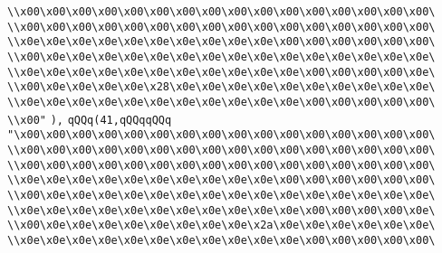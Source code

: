 \verb|\\x00\x00\x00\x00\x00\x00\x00\x00\x00\x00\x00\x00\x00\x00\x00\x00\|\newline
\verb|\\x00\x00\x00\x00\x00\x00\x00\x00\x00\x00\x00\x00\x00\x00\x00\x00\|\newline
\verb|\\x0e\x0e\x0e\x0e\x0e\x0e\x0e\x0e\x0e\x0e\x00\x00\x00\x00\x00\x00\|\newline
\verb|\\x00\x0e\x0e\x0e\x0e\x0e\x0e\x0e\x0e\x0e\x0e\x0e\x0e\x0e\x0e\x0e\|\newline
\verb|\\x0e\x0e\x0e\x0e\x0e\x0e\x0e\x0e\x0e\x0e\x0e\x00\x00\x00\x00\x0e\|\newline
\verb|\\x00\x0e\x0e\x0e\x0e\x28\x0e\x0e\x0e\x0e\x0e\x0e\x0e\x0e\x0e\x0e\|\newline
\verb|\\x0e\x0e\x0e\x0e\x0e\x0e\x0e\x0e\x0e\x0e\x0e\x00\x00\x00\x00\x00\|\newline
\verb|\\x00"|\newline
\verb|),|\newline
\verb|qQQq(41,qQQqqQQq|\newline
\verb|"\x00\x00\x00\x00\x00\x00\x00\x00\x00\x00\x00\x00\x00\x00\x00\x00\|\newline
\verb|\\x00\x00\x00\x00\x00\x00\x00\x00\x00\x00\x00\x00\x00\x00\x00\x00\|\newline
\verb|\\x00\x00\x00\x00\x00\x00\x00\x00\x00\x00\x00\x00\x00\x00\x00\x00\|\newline
\verb|\\x0e\x0e\x0e\x0e\x0e\x0e\x0e\x0e\x0e\x0e\x00\x00\x00\x00\x00\x00\|\newline
\verb|\\x00\x0e\x0e\x0e\x0e\x0e\x0e\x0e\x0e\x0e\x0e\x0e\x0e\x0e\x0e\x0e\|\newline
\verb|\\x0e\x0e\x0e\x0e\x0e\x0e\x0e\x0e\x0e\x0e\x0e\x00\x00\x00\x00\x0e\|\newline
\verb|\\x00\x0e\x0e\x0e\x0e\x0e\x0e\x0e\x0e\x2a\x0e\x0e\x0e\x0e\x0e\x0e\|\newline
\verb|\\x0e\x0e\x0e\x0e\x0e\x0e\x0e\x0e\x0e\x0e\x0e\x00\x00\x00\x00\x00\|\newline
